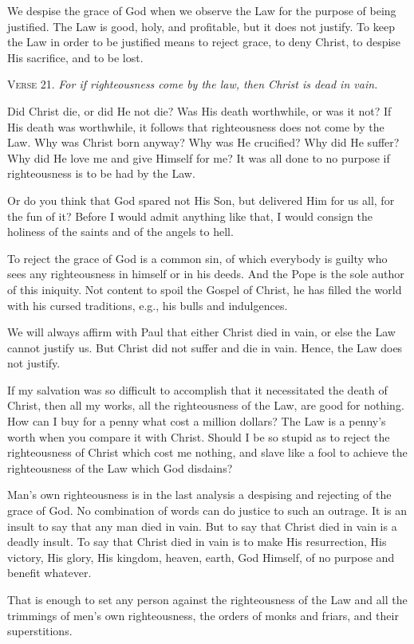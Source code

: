 We despise the grace of God when we observe the Law for the purpose of being justified. The Law is good, holy, and profitable, but it does not justify. To keep the Law in order to be justified means to reject grace, to deny Christ, to despise His sacrifice, and to be lost.

\textsc{Verse} 21. \emph{For if righteousness come by the law, then Christ is dead in vain.}

Did Christ die, or did He not die? Was His death worthwhile, or was it not? If His death was worthwhile, it follows that righteousness does not come by the Law. Why was Christ born anyway? Why was He crucified? Why did He suffer? Why did He love me and give Himself for me? It was all done to no purpose if righteousness is to be had by the Law.

Or do you think that God spared not His Son, but delivered Him for us all, for the fun of it? Before I would admit anything like that, I would consign the holiness of the saints and of the angels to hell.

To reject the grace of God is a common sin, of which everybody is guilty who sees any righteousness in himself or in his deeds. And the Pope is the sole author of this iniquity. Not content to spoil the Gospel of Christ, he has filled the world with his cursed traditions, e.g., his bulls and indulgences.

We will always affirm with Paul that either Christ died in vain, or else the Law cannot justify us. But Christ did not suffer and die in vain. Hence, the Law does not justify.

If my salvation was so difficult to accomplish that it necessitated the death of Christ, then all my works, all the righteousness of the Law, are good for nothing. How can I buy for a penny what cost a million dollars? The Law is a penny’s worth when you compare it with Christ. Should I be so stupid as to reject the righteousness of Christ which cost me nothing, and slave like a fool to achieve the righteousness of the Law which God disdains?

Man’s own righteousness is in the last analysis a despising and rejecting of the grace of God. No combination of words can do justice to such an outrage. It is an insult to say that any man died in vain. But to say that Christ died in vain is a deadly insult. To say that Christ died in vain is to make His resurrection, His victory, His glory, His kingdom, heaven, earth, God Himself, of no purpose and benefit whatever.

That is enough to set any person against the righteousness of the Law and all the trimmings of men’s own righteousness, the orders of monks and friars, and their superstitions.

